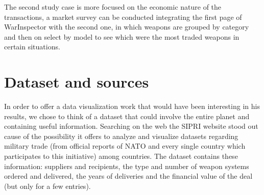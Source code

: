\documentclass{article}
\begin{document}
\begin{multicols}{2}
The second study case is more focused on the economic nature of the transactions, a market survey can be conducted integrating the first page of WarInspector with the second one, in which weapons are grouped by category and then on select by model to see which were the most traded weapons in certain situations. 



\section{Dataset and sources}
%


In order to offer a data visualization work that would have been interesting in his results, we chose to think of a dataset that could involve the entire planet and containing useful information. Searching on the web the SIPRI website stood out cause of the possibility it offers to analyze and visualize datasets regarding military trade (from official reports of NATO and every single country which participates to this initiative) among countries. The dataset contains these information: suppliers and recipients, the type and number of weapon systems ordered and delivered, the years of deliveries and the financial value of the deal (but only for a few entries). 


\end{multicols}
\end{document}
